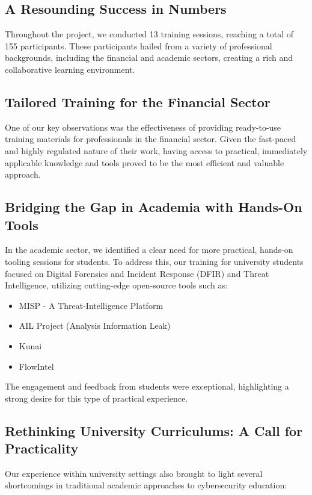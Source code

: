 \documentclass[10pt,a4paper]{report}
\begin{document}
\subsection*{A Resounding Success in Numbers}
Throughout the project, we conducted 13 training sessions, reaching a total
of 155 participants. These participants hailed from a variety of professional
backgrounds, including the financial and academic sectors, creating a rich and
collaborative learning environment.

\subsection*{Tailored Training for the Financial Sector}
One of our key observations was the effectiveness of providing ready-to-use
training materials for professionals in the financial sector. Given the
fast-paced and highly regulated nature of their work, having access to
practical, immediately applicable knowledge and tools proved to be the most
efficient and valuable approach.

\subsection*{Bridging the Gap in Academia with Hands-On Tools}
In the academic sector, we identified a clear need for more practical,
hands-on tooling sessions for students. To address this, our training for
university students focused on Digital Forensics and Incident Response (DFIR)
and Threat Intelligence, utilizing cutting-edge open-source tools such as:

\begin{itemize}
    \item MISP - A Threat-Intelligence Platform
    \item AIL Project (Analysis Information Leak)
    \item Kunai
    \item FlowIntel
\end{itemize}

The engagement and feedback from students were exceptional, highlighting a
strong desire for this type of practical experience.

\subsection*{Rethinking University Curriculums: A Call for Practicality}

Our experience within university settings also brought to light several
shortcomings in traditional academic approaches to cybersecurity education:
\end{document}
